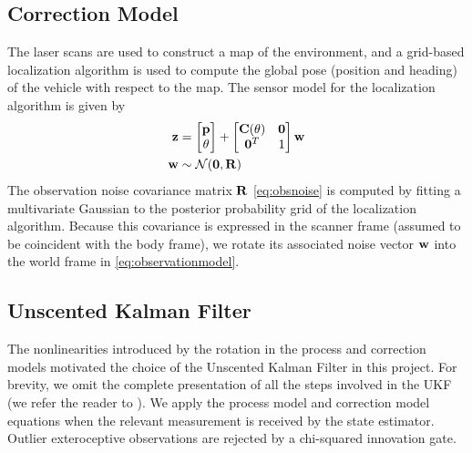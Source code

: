 \subsection{Correction Model}
The laser scans are used to construct a map of the environment, and a grid-based localization algorithm is used to compute the global pose (position and heading) of the vehicle with respect to the map.
The sensor model for the localization algorithm is given by
\begin{align}
  \mbf{z} &= \bbm \mbf{p} \\ \theta \ebm + \bbm \mbf{C}(\theta) & \mbf{0} \\ \mbf{0}^T & 1 \ebm \mbf{w} \label{eq:observationmodel} \\
  \mbf{w} &\sim \mathcal{N}(\mbf{0}, \mbf{R} ) \label{eq:obsnoise}
\end{align}
The observation noise covariance matrix $\mathbf{R}$ \eqref{eq:obsnoise} is computed by fitting a multivariate Gaussian to the posterior probability grid of the localization algorithm.
Because this covariance is expressed in the scanner frame (assumed to be coincident with the body frame), we rotate its associated noise vector $\mathbf{w}$ into the world frame in \eqref{eq:observationmodel}.

\subsection{Unscented Kalman Filter}
The nonlinearities introduced by the rotation in the process and correction models motivated the choice of the Unscented Kalman Filter in this project.
For brevity, we omit the complete presentation of all the steps involved in the UKF (we refer the reader to \cite{Julier97_SPIE}).
We apply the process model and correction model equations when the relevant measurement is received by the state estimator.
Outlier exteroceptive observations are rejected by a chi-squared innovation gate.
